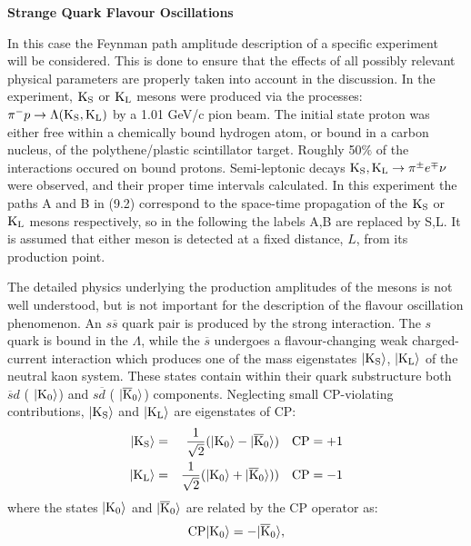 \documentclass [12pt]{article}
\begin{document}
{   \par {\bf \Large Strange Quark Flavour Oscillations}
    \par In this case the Feynman path amplitude description of a specific experiment~\cite{DSDQ} will be considered.
     This is done to ensure that the effects of all possibly relevant physical parameters are properly taken 
    into account in the discussion. In the experiment, ${\rm K_S}$ or ${\rm K_L}$ mesons were produced via the 
    processes: $\pi^- p \rightarrow \Lambda ({\rm K_S},{\rm K_L})$ by a 1.01 GeV/c pion  beam.
    The initial state proton was either free within a chemically bound hydrogen atom, or bound in a carbon nucleus,
    of the polythene/plastic scintillator target. Roughly 50$\%$ of the interactions occured on bound protons.
      Semi-leptonic decays ${\rm K_S},{\rm K_L} \rightarrow \pi^{\pm}e^{\mp} \nu$ were observed, and their 
    proper time intervals calculated. In this experiment the paths A and B in (9.2) correspond to
    the space-time propagation of the  ${\rm K_S}$ or ${\rm K_L}$ mesons respectively, so in the following
    the labels A,B are replaced by S,L. It is assumed that either meson is detected at a fixed distance,
    $L$, from its production point.
    \par   The detailed physics underlying the production amplitudes of the mesons is not well understood,
     but is not important for the description of the flavour oscillation phenomenon. An $s\overline{s}$ quark
   pair is produced by the strong interaction. The $s$ quark is bound in the $\Lambda$, while the $\overline{s}$
    undergoes a flavour-changing weak charged-current interaction which produces one of the mass eigenstates
    $|{\rm K_S}\rangle$, $|{\rm K_L}\rangle$ of the neutral kaon system. These states contain within their
    quark substructure both  $\overline{s}d$ ( $|{\rm K_0}\rangle$) and  $s\overline{d}$ ( $|{\rm \overline{K}_0}\rangle$)
    components. Neglecting small CP-violating contributions,  $|{\rm K_S}\rangle$ and $|{\rm K_L}\rangle$
    are eigenstates of CP:
    \begin{eqnarray}
     |{\rm K_S}\rangle &  = & \frac{1}{\sqrt{2}}(|{\rm K_0}\rangle-|{\rm \overline{K}_0}\rangle)~~~{\rm CP}=+1 \\
     |{\rm K_L}\rangle &  = & \frac{1}{\sqrt{2}}(|{\rm K_0}\rangle+|{\rm \overline{K}_0}\rangle))~~~{\rm CP}=-1
    \end{eqnarray}
  where the states  $|{\rm K_0}\rangle$ and  $|{\rm \overline{K}_0}\rangle$ are related by the CP operator as:
   \[{\rm CP} |{\rm K_0}\rangle = - |{\rm \overline{K}_0}\rangle,
\]}
\end{document}
